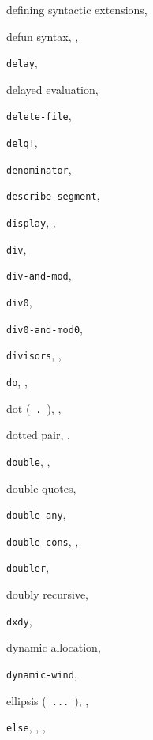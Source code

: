 {\begin{multicols}{2}
defining syntactic extensions, \pageref{further_s11}
  
defun syntax, \pageref{start_s87}, \pageref{further_s9}
  
\texttt{delay}, \textit{\pageref{control_s65}}
  
delayed evaluation, \pageref{examples_s59}
  
\texttt{delete-file}, \textit{\pageref{io_s90}}
  
\texttt{delq!}, \pageref{start_s185}
  
\texttt{denominator}, \textit{\pageref{objects_s119}}
  
\texttt{describe-segment}, \pageref{control_s75}
  
\texttt{display}, \textit{\pageref{io_s85}}, \pageref{examples_s33}
  
\texttt{div}, \textit{\pageref{objects_s99}}
  
\texttt{div-and-mod}, \textit{\pageref{objects_s99}}
  
\texttt{div0}, \textit{\pageref{objects_s100}}
  
\texttt{div0-and-mod0}, \textit{\pageref{objects_s100}}
  
\texttt{divisors}, \pageref{control_s24}, \pageref{control_s29}
  
\texttt{do}, \textit{\pageref{control_s25}}, \pageref{syntax_s53}
  
dot ( \texttt{.} ), \pageref{start_s31}, \pageref{grammar_s21}
  
dotted pair, \pageref{start_s32}, \pageref{objects_s35}
  
\texttt{double}, \pageref{start_s65}, \pageref{start_s89}
  
double quotes, \pageref{objects_s214}
  
\texttt{double-any}, \pageref{start_s79}
  
\texttt{double-cons}, \pageref{start_s66}, \pageref{start_s90}
  
\texttt{doubler}, \pageref{start_s88}
  
doubly recursive, \pageref{further_s49}
  
\texttt{dxdy}, \pageref{control_s72}
  
dynamic allocation, \pageref{intro_s2}
  
\texttt{dynamic-wind}, \textit{\pageref{control_s56}}
  
ellipsis ( \texttt{...} ), \pageref{further_s21}, \pageref{syntax_s21}
  
\texttt{else}, \pageref{control_s15}, \textit{\pageref{control_s16}}, \pageref{control_s19}
  

\end{multicols}}
